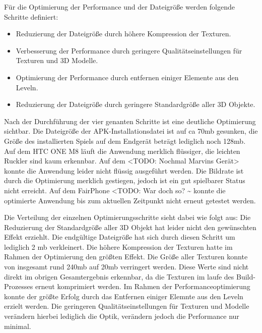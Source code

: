 	Für die Optimierung der Performance und der Dateigröße werden folgende Schritte definiert:
	\begin{itemize}
	\item{ Reduzierung der Dateigröße durch höhere Kompression der Texturen.}
	\item{ Verbesserung der Performance durch geringere Qualitätseinstellungen für Texturen und 3D Modelle.}
	\item{ Optimierung der Performance durch entfernen einiger Elemente aus den Leveln.}
	\item{ Reduzierung der Dateigröße durch geringere Standardgröße aller 3D Objekte.}
	\end{itemize}

	Nach der Durchführung der vier genanten Schritte ist eine deutliche Optimierung sichtbar. Die Dateigröße der APK-Installationsdatei ist auf ca 70mb gesunken, die Größe des installierten Spiels auf dem Endgerät beträgt lediglich noch 128mb.
	Auf dem HTC ONE M8 läuft die Anwendung merklich flüssiger, die leichten Ruckler sind kaum erkennbar. Auf dem <TODO: Nochmal Marvins Gerät> konnte die Anwendung leider nicht flüssig ausgeführt werden. Die Bildrate ist durch die Optimierung merklich gestiegen, jedoch ist ein gut spielbarer Status nicht erreicht. Auf dem FairPhone <TODO: War doch so? ^^> konnte die optimierte Anwendung bis zum aktuellen Zeitpunkt nicht erneut getestet werden.

	Die Verteilung der einzelnen Optimierungsschritte sieht dabei wie folgt aus:
	Die Reduzierung der Standardgröße aller 3D Objekt hat leider nicht den gewünschten Effekt erziehlt. Die endgültige Dateigröße hat sich durch diesen Schritt um lediglich 2 mb verkleinert. Die höhere Kompression der Texturen hatte im Rahmen der Optimierung den größten Effekt. Die Größe aller Texturen konnte von insgesamt rund 240mb auf 20mb verringert werden. Diese Werte sind nicht direkt im obrigen Gesamtergebnis erkennbar, da die Texturen im laufe des Build-Prozesses erneut komprimiert werden.
	Im Rahmen der Performanceoptimierung konnte der größte Erfolg durch das Entfernen einiger Elemnte aus den Leveln erzielt werden. Die geringeren Qualitätseinstellungen für Texturen und Modelle verändern hierbei lediglich die Optik, verändern jedoch die Performance nur minimal. 


